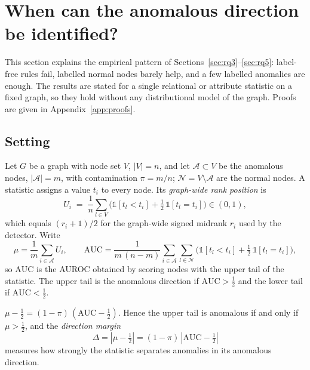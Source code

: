 \section{When can the anomalous direction be identified?}\label{sec:theory}

This section explains the empirical pattern of Sections~\ref{sec:rq3}--\ref{sec:rq5}: label-free rules fail, labelled normal nodes barely help, and a few labelled anomalies are enough. The results are stated for a single relational or attribute statistic on a fixed graph, so they hold without any distributional model of the graph. Proofs are given in Appendix~\ref{app:proofs}.

\subsection{Setting}

Let $G$ be a graph with node set $V$, $|V| = n$, and let $\mathcal{A} \subset V$ be the anomalous nodes, $|\mathcal{A}| = m$, with contamination $\pi = m/n$; $\mathcal{N} = V \setminus \mathcal{A}$ are the normal nodes. A statistic assigns a value $t_i$ to every node. Its \emph{graph-wide rank position} is
\begin{equation}\label{eq:rankpos}
U_i \;=\; \frac{1}{n}\sum_{l \in V}\Big(\mathbb{1}[t_l < t_i] + \tfrac12\,\mathbb{1}[t_l = t_i]\Big) \in (0,1),
\end{equation}
which equals $(r_i + 1)/2$ for the graph-wide signed midrank $r_i$ used by the detector. Write
\begin{equation}
\mu = \frac{1}{m}\sum_{i \in \mathcal{A}} U_i, \qquad
\mathrm{AUC} = \frac{1}{m\,(n-m)}\sum_{i \in \mathcal{A}}\sum_{l \in \mathcal{N}}\Big(\mathbb{1}[t_l < t_i] + \tfrac12\,\mathbb{1}[t_l = t_i]\Big),
\end{equation}
so $\mathrm{AUC}$ is the AUROC obtained by scoring nodes with the upper tail of the statistic. The upper tail is the anomalous direction if $\mathrm{AUC} > \tfrac12$ and the lower tail if $\mathrm{AUC} < \tfrac12$.

\begin{lemma}\label{lem:sign}
$\mu - \tfrac12 = (1-\pi)\,(\mathrm{AUC} - \tfrac12)$. Hence the upper tail is anomalous if and only if $\mu > \tfrac12$, and the \emph{direction margin}
\[ \Delta = |\mu - \tfrac12| = (1-\pi)\,|\mathrm{AUC} - \tfrac12| \]
measures how strongly the statistic separates anomalies in its anomalous direction.
\end{lemma}

